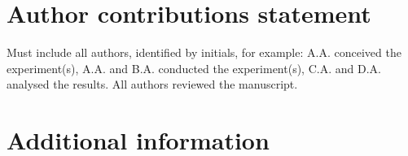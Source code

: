 \documentclass[fleqn,10pt]{wlscirep}
\begin{document}
\section*{Author contributions statement}

Must include all authors, identified by initials, for example:
A.A. conceived the experiment(s),  A.A. and B.A. conducted the experiment(s), C.A. and D.A. analysed the results.  All authors reviewed the manuscript. 

\section*{Additional information}





\end{document}
